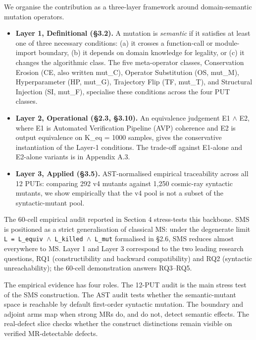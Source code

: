 \documentclass[acmsmall,screen,review]{acmart}
\providecommand{\tightlist}{\setlength{\itemsep}{0pt}\setlength{\parskip}{0pt}}
\begin{document}
We organise the contribution as a three-layer framework around
domain-semantic mutation operators.

\begin{itemize}
\tightlist
\item
  \textbf{Layer 1, Definitional (§3.2).} A mutation is \emph{semantic}
  if it satisfies at least one of three necessary conditions: (a) it
  crosses a function-call or module-import boundary, (b) it depends on
  domain knowledge for legality, or (c) it changes the algorithmic
  class. The five meta-operator classes, Conservation Erosion (CE, also
  written mut\_C), Operator Substitution (OS, mut\_M), Hyperparameter
  (HP, mut\_G), Trajectory Flip (TF, mut\_T), and Structural Injection
  (SI, mut\_F), specialise these conditions across the four PUT classes.
\item
  \textbf{Layer 2, Operational (§2.3, §3.10).} An equivalence judgement
  E1 $\wedge$ E2, where E1 is Automated Verification Pipeline (AVP) coherence
  and E2 is output equivalence on K\_eq = 1000 samples, gives the
  conservative instantiation of the Layer-1 conditions. The trade-off
  against E1-alone and E2-alone variants is in Appendix A.3.
\item
  \textbf{Layer 3, Applied (§3.5).} AST-normalised empirical
  traceability across all 12 PUTs: comparing 292 v4 mutants against
  1,250 cosmic-ray syntactic mutants, we show empirically that the v4
  pool is not a subset of the syntactic-mutant pool.
\end{itemize}

The 60-cell empirical audit reported in Section 4 stress-tests this
backbone. SMS is positioned as a strict generalisation of classical MS:
under the
degenerate limit \texttt{L\ =\ L\_equiv\ $\wedge$\ L\_killed\ $\wedge$\ L\_mut}
formalised in §2.6, SMS reduces almost everywhere to MS. Layer 1 and
Layer 3 correspond to the two leading research questions, RQ1
(constructibility and backward compatibility) and RQ2 (syntactic
unreachability); the 60-cell demonstration answers RQ3--RQ5.

The empirical evidence has four roles. The 12-PUT audit is the main
stress test of the SMS construction. The AST audit tests whether the
semantic-mutant space is reachable by default first-order syntactic
mutation. The boundary and adjoint arms map when strong MRs do, and do
not, detect semantic effects. The real-defect slice checks whether the
construct distinctions remain visible on verified MR-detectable defects.
\end{document}
